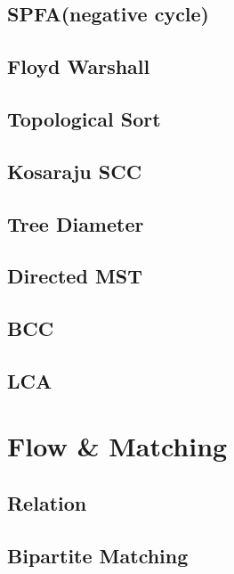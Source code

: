     \subsection{SPFA(negative cycle)}
        
    \subsection{Floyd Warshall}
        
    \subsection{Topological Sort}
        
    \subsection{Kosaraju SCC}
        
    \subsection{Tree Diameter}
        
    \subsection{Directed MST}
        
    \subsection{BCC}
        
    \subsection{LCA}
        

\section{Flow \& Matching}
    \subsection{Relation}
        
    \subsection{Bipartite Matching}
        
